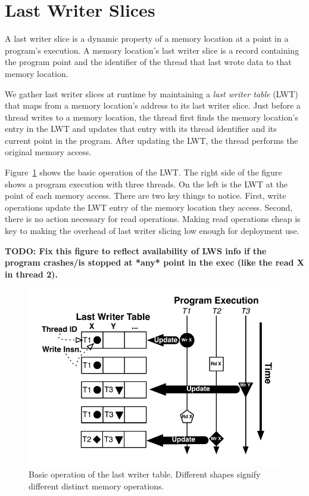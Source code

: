 \documentclass[preprint,9pt]{sigplanconf}
\newcommand{\lwt}{LWT\xspace}
\begin{document}
\section{Last Writer Slices}
\label{sec:lastwriterslices}
A last writer slice is a dynamic property of a memory location at a point in a
program's execution.   A memory location's last writer slice is a record
containing the program point and the identifier of the thread that last wrote
data to that memory location.  


We gather last writer slices at runtime by maintaining a {\em last writer
table} (\lwt) that maps from a memory location's address to its last writer
slice.  Just before a thread writes to a memory location, the thread first
finds the memory location's entry in the \lwt and updates that entry with its
thread identifier and its current point in the program.  After updating the
\lwt, the thread performs the original memory access.  


Figure~\ref{fig:basicLWT} shows the basic operation of the \lwt.  The right
side of the figure shows a program execution with three threads.  On the left
is the \lwt at the point of each memory access.  There are two key things to
notice.  First, write operations update the \lwt entry of the memory location
they access.  Second, there is no action necessary for read operations.
Making read operations cheap is key to making the overhead of last writer
slicing low enough for deployment use.

{\bf TODO: Fix this figure to reflect availability of LWS info if the program crashes/is stopped at *any* point in the exec (like the read X in thread 2).}

\begin{figure}[h]
\centering
\includegraphics[scale=.6]{figs/BasicLWT.pdf}
\caption{\label{fig:basicLWT}Basic operation of the last writer table. Different shapes signify different distinct memory operations. }
\end{figure}
\end{document}
